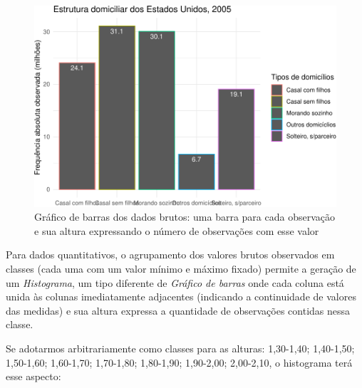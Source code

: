 \documentclass[
]{book}
\newenvironment{Shaded}{\begin{snugshade}}{\end{snugshade}}
\newcommand{\AttributeTok}[1]{\textcolor[rgb]{0.77,0.63,0.00}{#1}}
\newcommand{\DecValTok}[1]{\textcolor[rgb]{0.00,0.00,0.81}{#1}}
\newcommand{\FloatTok}[1]{\textcolor[rgb]{0.00,0.00,0.81}{#1}}
\newcommand{\FunctionTok}[1]{\textcolor[rgb]{0.00,0.00,0.00}{#1}}
\newcommand{\NormalTok}[1]{#1}
\newcommand{\SpecialCharTok}[1]{\textcolor[rgb]{0.00,0.00,0.00}{#1}}
\newcommand{\StringTok}[1]{\textcolor[rgb]{0.31,0.60,0.02}{#1}}
\begin{document}
\begin{figure}
\centering
\includegraphics{apostila_files/figure-latex/unnamed-chunk-51-1.pdf}
\caption{\label{fig:unnamed-chunk-51}Gráfico de barras dos dados brutos: uma barra para cada observação e sua altura expressando o número de observações com esse valor}
\end{figure}

Para dados quantitativos, o agrupamento dos valores brutos observados em classes (cada uma com um valor mínimo e máximo fixado) permite a geração de um \emph{Histograma}, um tipo diferente de \emph{Gráfico de barras} onde cada coluna está unida às colunas imediatamente adjacentes (indicando a continuidade de valores das medidas) e sua altura expressa a quantidade de observações contidas nessa classe.

Se adotarmos arbitrariamente como classes para as alturas: 1,30-1,40; 1,40-1,50; 1,50-1,60; 1,60-1,70; 1,70-1,80; 1,80-1,90; 1,90-2,00; 2,00-2,10, o histograma terá esse aspecto:

\begin{Shaded}
\end{Shaded}
\end{document}

